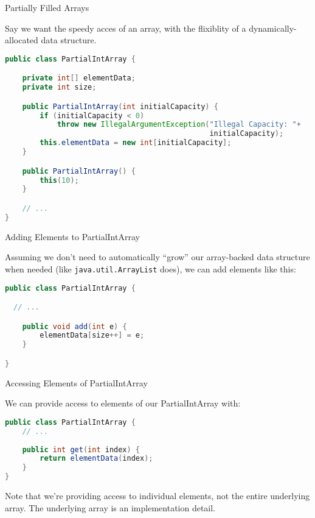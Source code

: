 \documentclass{beamer}
\begin{document}
\begin{frame}[fragile]{Partially Filled Arrays}


Say we want the speedy acces of an array, with the flixiblity of a dynamically-allocated data structure.

\begin{lstlisting}[language=Java]
public class PartialIntArray {

    private int[] elementData;
    private int size;

    public PartialIntArray(int initialCapacity) {
        if (initialCapacity < 0)
            throw new IllegalArgumentException("Illegal Capacity: "+
                                               initialCapacity);
        this.elementData = new int[initialCapacity];
    }

    public PartialIntArray() {
        this(10);
    }

    // ...
}
\end{lstlisting}

\end{frame}

\begin{frame}[fragile]{Adding Elements to PartialIntArray}


Assuming we don't need to automatically ``grow'' our array-backed data structure when needed (like {\tt java.util.ArrayList} does), we can add elements like this:

\begin{lstlisting}[language=Java]
public class PartialIntArray {

  // ...

    public void add(int e) {
        elementData[size++] = e;
    }

}
\end{lstlisting}

\end{frame}

\begin{frame}[fragile]{Accessing Elements of PartialIntArray}


We can provide access to elements of our PartialIntArray with:

\begin{lstlisting}[language=Java]
public class PartialIntArray {
    // ...
    
    public int get(int index) {
        return elementData(index);
    }
}
\end{lstlisting}

Note that we're providing access to individual elements, not the entire underlying array.  The underlying array is an implementation detail.
\end{frame}
\end{document}
